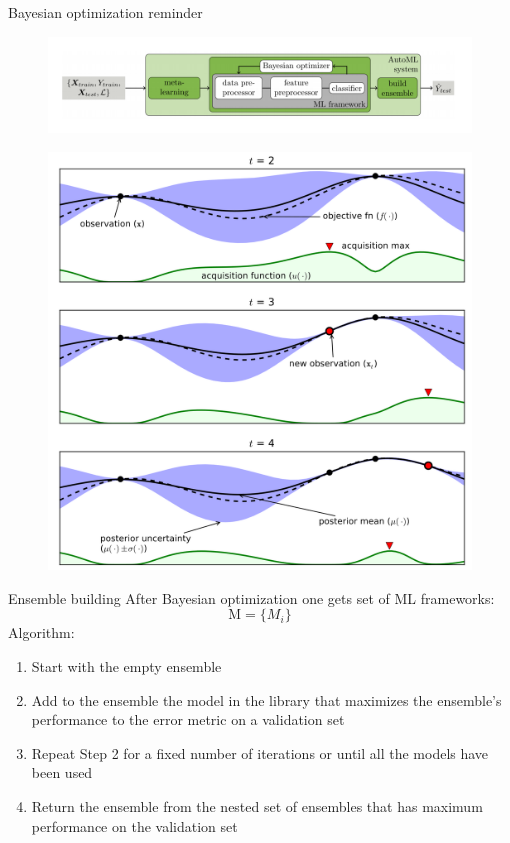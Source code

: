 \documentclass[12pt]{beamer}
\begin{document}
\begin{frame}{Bayesian optimization reminder}
\begin{figure}
\includegraphics[scale=0.25]{Auto_sklearn.png} 
\end{figure}
\begin{figure}
\includegraphics[scale=0.25]{Bayes_optimization.png} 
\end{figure}
\end{frame}


\begin{frame}{Ensemble building}
After  Bayesian optimization one gets set of ML frameworks:
$$
\mathrm{M} = \{M_i\}
$$
\pause
Algorithm:
\pause
\begin{enumerate}
    \item Start with the empty ensemble \pause
    \item Add to the ensemble the model in the library that maximizes the ensemble's performance to the error metric on a validation set \pause
    \item Repeat Step 2 for a fixed number of iterations or until all the models have been used \pause
    \item Return the ensemble from the nested set of ensembles that has maximum performance on the validation set \pause
\end{enumerate}


\end{frame}
\end{document}
